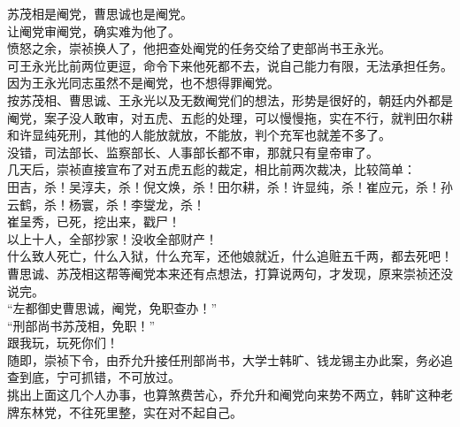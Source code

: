 \begin{multicols}{\theparacolNo}
苏茂相是阉党，曹思诚也是阉党。\\

让阉党审阉党，确实难为他了。\\

愤怒之余，崇祯换人了，他把查处阉党的任务交给了吏部尚书王永光。\\

可王永光比前两位更逗，命令下来他死都不去，说自己能力有限，无法承担任务。\\

因为王永光同志虽然不是阉党，也不想得罪阉党。\\

按苏茂相、曹思诚、王永光以及无数阉党们的想法，形势是很好的，朝廷内外都是阉党，案子没人敢审，对五虎、五彪的处理，可以慢慢拖，实在不行，就判田尔耕和许显纯死刑，其他的人能放就放，不能放，判个充军也就差不多了。\\

没错，司法部长、监察部长、人事部长都不审，那就只有皇帝审了。\\

几天后，崇祯直接宣布了对五虎五彪的裁定，相比前两次裁决，比较简单：\\

田吉，杀！吴淳夫，杀！倪文焕，杀！田尔耕，杀！许显纯，杀！崔应元，杀！孙云鹤，杀！杨寰，杀！李燮龙，杀！\\

崔呈秀，已死，挖出来，戳尸！\\

以上十人，全部抄家！没收全部财产！\\

什么致人死亡，什么入狱，什么充军，还他娘就近，什么追赃五千两，都去死吧！\\

曹思诚、苏茂相这帮等阉党本来还有点想法，打算说两句，才发现，原来崇祯还没说完。\\

“左都御史曹思诚，阉党，免职查办！”\\

“刑部尚书苏茂相，免职！”\\

跟我玩，玩死你们！\\

随即，崇祯下令，由乔允升接任刑部尚书，大学士韩旷、钱龙锡主办此案，务必追查到底，宁可抓错，不可放过。\\

挑出上面这几个人办事，也算煞费苦心，乔允升和阉党向来势不两立，韩旷这种老牌东林党，不往死里整，实在对不起自己。\\


\end{multicols}
